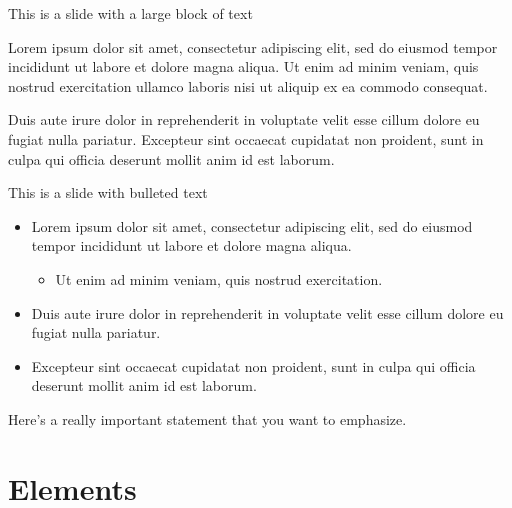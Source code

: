 \documentclass[aspectratio=169,10pt]{beamer}
\begin{document}
{{
}
\begin{frame}
\maketitle
\end{frame}
}

\begin{frame}{This is a slide with a large block of text}
\begin{block}{}
Lorem ipsum dolor sit amet, consectetur adipiscing elit,
sed do eiusmod tempor incididunt ut labore et dolore magna
aliqua. Ut enim ad minim veniam, quis nostrud exercitation
ullamco laboris nisi ut aliquip ex ea commodo consequat.

Duis aute irure dolor in reprehenderit in voluptate velit
esse cillum dolore eu fugiat nulla pariatur. Excepteur
sint occaecat cupidatat non proident, sunt in culpa qui
officia deserunt mollit anim id est laborum.
\end{block}
\end{frame}

\begin{frame}{This is a slide with bulleted text}
\begin{itemize}
\item Lorem ipsum dolor sit amet, consectetur adipiscing elit, sed do eiusmod
	tempor incididunt ut labore et dolore magna aliqua.
	\begin{itemize}
	\item Ut enim ad minim veniam, quis nostrud exercitation.
	\end{itemize}
\item Duis aute irure dolor in reprehenderit in voluptate velit esse cillum
	dolore eu fugiat nulla pariatur.
\item Excepteur sint occaecat cupidatat non proident, sunt in culpa qui officia
	deserunt mollit anim id est laborum.
\end{itemize}
\end{frame}

\begin{frame}[standout]
Here's a really important statement that you want to emphasize.
\end{frame}

\section{Elements}
\end{document}
